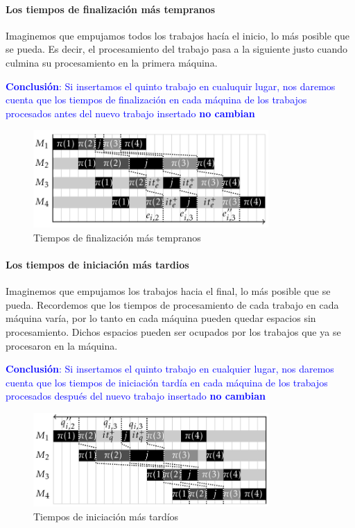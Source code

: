 \documentclass[10pt, a4paper]{article}
\begin{document}
\paragraph{Los tiempos de finalización más tempranos}

Imaginemos que empujamos todos los trabajos hacía el inicio, lo más posible 
que se pueda. Es decir, el procesamiento del trabajo pasa a la siguiente justo 
cuando culmina su procesamiento en la primera máquina.

\textcolor{blue}{\textbf{Conclusión}: Si insertamos el quinto  trabajo en cualuquir 
lugar, nos daremos cuenta que los tiempos de finalización en cada máquina de los 
trabajos procesados antes del nuevo trabajo insertado \textbf{no cambian}}

\begin{figure}[H]
  \centering
  \includegraphics[width=0.8\textwidth]{./.github/1733346799.png}
  \caption{Tiempos de finalización más 
  tempranos}\label{fig:Relative-earliest-completion-times}
\end{figure}

\paragraph{Los tiempos de iniciación más tardios}

Imaginemos que empujamos los trabajos hacia el final, lo más posible 
que se pueda. Recordemos que los tiempos de procesamiento de cada trabajo en cada 
máquina varía, por lo tanto en cada máquina pueden quedar espacios sin 
procesamiento. Dichos espacios pueden ser ocupados por los trabajos que ya se 
procesaron en la máquina.

\textcolor{blue}{\textbf{Conclusión}: Si insertamos el quinto trabajo en cualquier 
lugar, nos daremos cuenta que los tiempos de iniciación tardía en cada máquina de 
los trabajos procesados después del nuevo trabajo insertado \textbf{no cambian}}

\begin{figure}[H]
  \centering
  \includegraphics[width=0.8\textwidth]{./.github/1733346809.png}
  \caption{Tiempos de iniciación más 
  tardíos}\label{fig:Relative-latest-starting-times}
\end{figure}
\end{document}
